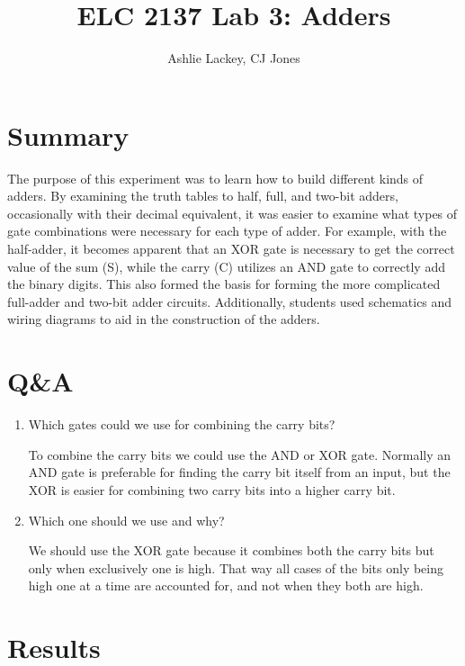 \documentclass[11pt]{article}
\begin{document}
\title{ELC 2137 Lab 3: Adders }
\author{Ashlie Lackey, CJ Jones}

\maketitle


\section*{Summary}

The purpose of this experiment was to learn how to build different kinds of adders. By examining the truth tables to half, full, and two-bit adders, occasionally with their decimal equivalent, it was easier to examine what types of gate combinations were necessary for each type of adder. For example, with the half-adder, it becomes apparent that an XOR gate is necessary to get the correct value of the sum (S), while the carry (C) utilizes an AND gate to correctly add the binary digits. This also formed the basis for forming the more complicated full-adder and two-bit adder circuits. Additionally, students used schematics and wiring diagrams to aid in the construction of the adders.


\section*{Q\&A}

\begin{enumerate}
	\item Which gates could we use for combining the carry bits?
	
	To combine the carry bits we could use the AND or XOR gate. Normally an AND gate is preferable for finding the carry bit itself from an input, but the XOR is easier for combining two carry bits into a higher carry bit. 
	
	\item Which one should we use and why?
	
	We should use the XOR gate because it combines both the carry bits but only when exclusively one is high. That way all cases of the bits only being high one at a time are accounted for, and not when they both are high. 
\end{enumerate}




\section*{Results}
\end{document}
